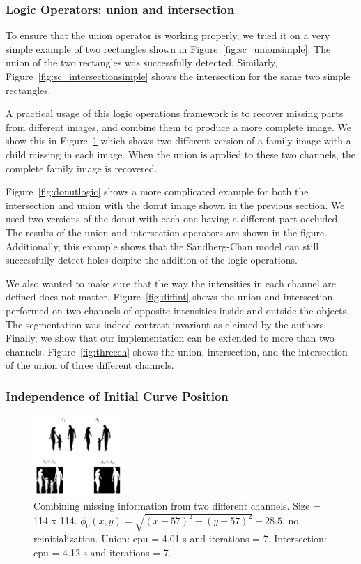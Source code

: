 \documentclass[10pt,twocolumn,letterpaper]{article}
\begin{document}
\subsubsection*{Logic Operators: union and intersection}

To ensure that the union operator is working properly, we tried it on a very simple example of two rectangles shown in Figure~\ref{fig:sc_unionsimple}. The
union of the two rectangles was successfully detected. Similarly, Figure~\ref{fig:sc_intersectionsimple} shows the intersection for the same two simple
rectangles. 

A practical usage of this logic operations framework is to recover missing parts from different images, and combine them to produce a more complete image. We
show this in Figure~\ref{fig:family} which shows two different version of a family image with a child missing in each image. When the union is applied to these
two channels, the complete family image is recovered.


Figure~\ref{fig:donutlogic} shows a more complicated example for both the intersection and union with the donut image shown in the previous section. We used
two versions of the donut with each one having a different part occluded. The results of the union and intersection operators are shown in the figure.
Additionally, this example shows that the Sandberg-Chan model can still successfully detect holes despite the addition of the logic operations.

We also wanted to make sure that the way the intensities in each channel are defined does not
matter. Figure~\ref{fig:diffint} shows the union and intersection performed on two channels of opposite intensities inside and outside the objects. The
segmentation was indeed contrast invariant as claimed by the authors. Finally, we show that our implementation can be extended to more than two channels.
Figure~\ref{fig:threech} shows the union, intersection, and the intersection of the union of three different channels.


\subsubsection*{Independence of Initial Curve Position}

\begin{figure}[t!]
\centering
\includegraphics[width=0.3\textwidth]{family.png}
\caption{Combining missing information from two different channels. Size = 114 x 114. $\phi_{0}(x,y) = \sqrt{(x - 57)^2 + (y - 57)^2} -
28.5$, no reinitialization. Union: cpu = 4.01 s and iterations = 7. Intersection: cpu = 4.12 s and iterations = 7.}
\label{fig:family}
\end{figure}
\end{document}
